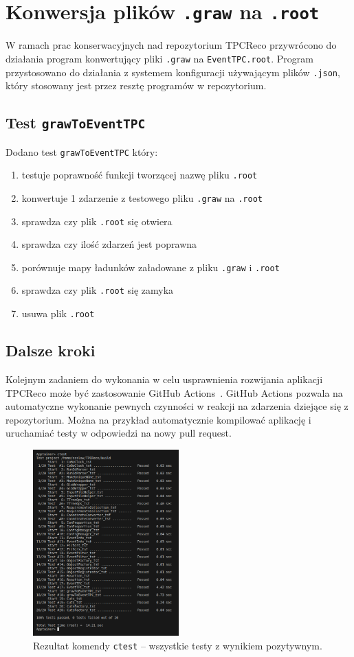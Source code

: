 \documentclass{article}
\begin{document}

\section{Konwersja plików \texttt{.graw} na \texttt{.root}}
W ramach prac konserwacyjnych nad repozytorium TPCReco przywrócono do działania program konwertujący pliki \texttt{.graw} na \texttt{EventTPC.root}. Program przystosowano do działania z systemem konfiguracji używającym plików \texttt{.json}, który stosowany jest przez resztę programów w repozytorium.
\subsection{Test \texttt{grawToEventTPC}}
Dodano test \texttt{grawToEventTPC} który:
\begin{enumerate}
    \item testuje poprawność funkcji tworzącej nazwę pliku \texttt{.root}
    \item konwertuje 1 zdarzenie z testowego pliku \texttt{.graw} na \texttt{.root}
    \item sprawdza czy plik \texttt{.root} się otwiera
    \item sprawdza czy ilość zdarzeń jest poprawna
    \item porównuje mapy ładunków załadowane z pliku \texttt{.graw} i \texttt{.root}
    \item sprawdza czy plik \texttt{.root} się zamyka
    \item usuwa plik \texttt{.root}
\end{enumerate}
\subsection{Dalsze kroki}
Kolejnym zadaniem do wykonania w celu usprawnienia rozwijania aplikacji TPCReco może być zastosowanie GitHub Actions~\cite{Actions}. GitHub Actions pozwala na automatyczne wykonanie pewnych czynności w reakcji na zdarzenia dziejące się z repozytorium. Można na przykład automatycznie kompilować aplikację i uruchamiać testy w odpowiedzi na nowy pull request.
\begin{figure}[H]
    \centering
    \includegraphics[width=0.5\textwidth]{img/tests.png}
    \caption{Rezultat komendy \texttt{ctest} -- wszystkie testy z wynikiem pozytywnym.}
\end{figure}
\end{document}
